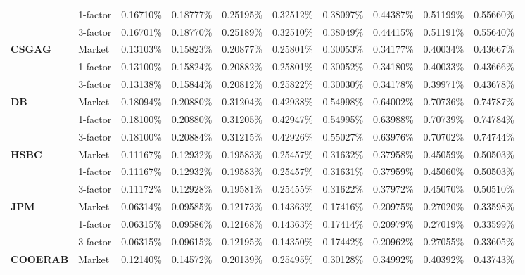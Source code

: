\documentclass[12pt,a4paper]{article}
\theoremstyle{plain}
\numberwithin{equation}{section}
\begin{document}
\begin{table}[t]
{\begin{tabular}{|rl|cccccccc|}
\cmidrule{3-10}          & 1-factor & 0.16710\% & 0.18777\% & 0.25195\% & 0.32512\% & 0.38097\% & 0.44387\% & 0.51199\% & 0.55660\% \\
          & 3-factor & 0.16701\% & 0.18770\% & 0.25189\% & 0.32510\% & 0.38049\% & 0.44415\% & 0.51191\% & 0.55640\% \\
    \midrule
    \midrule
    \multicolumn{1}{|l}{\textbf{CSGAG}} & Market & 0.13103\% & 0.15823\% & 0.20877\% & 0.25801\% & 0.30053\% & 0.34177\% & 0.40034\% & 0.43667\% \\
\cmidrule{3-10}          & 1-factor & 0.13100\% & 0.15824\% & 0.20882\% & 0.25801\% & 0.30052\% & 0.34180\% & 0.40033\% & 0.43666\% \\
          & 3-factor & 0.13138\% & 0.15844\% & 0.20812\% & 0.25822\% & 0.30030\% & 0.34178\% & 0.39971\% & 0.43678\% \\
    \midrule
    \midrule
    \multicolumn{1}{|l}{\textbf{DB}} & Market & 0.18094\% & 0.20880\% & 0.31204\% & 0.42938\% & 0.54998\% & 0.64002\% & 0.70736\% & 0.74787\% \\
\cmidrule{3-10}          & 1-factor & 0.18100\% & 0.20880\% & 0.31205\% & 0.42947\% & 0.54995\% & 0.63988\% & 0.70739\% & 0.74784\% \\
          & 3-factor & 0.18100\% & 0.20884\% & 0.31215\% & 0.42926\% & 0.55027\% & 0.63976\% & 0.70702\% & 0.74744\% \\
    \midrule
    \midrule
    \multicolumn{1}{|l}{\textbf{HSBC}} & Market & 0.11167\% & 0.12932\% & 0.19583\% & 0.25457\% & 0.31632\% & 0.37958\% & 0.45059\% & 0.50503\% \\
\cmidrule{3-10}          & 1-factor & 0.11167\% & 0.12932\% & 0.19583\% & 0.25457\% & 0.31631\% & 0.37959\% & 0.45060\% & 0.50503\% \\
          & 3-factor & 0.11172\% & 0.12928\% & 0.19581\% & 0.25455\% & 0.31622\% & 0.37972\% & 0.45070\% & 0.50510\% \\
    \midrule
    \midrule
    \multicolumn{1}{|l}{\textbf{JPM}} & Market & 0.06314\% & 0.09585\% & 0.12173\% & 0.14363\% & 0.17416\% & 0.20975\% & 0.27020\% & 0.33598\% \\
\cmidrule{3-10}          & 1-factor & 0.06315\% & 0.09586\% & 0.12168\% & 0.14363\% & 0.17414\% & 0.20979\% & 0.27019\% & 0.33599\% \\
          & 3-factor & 0.06315\% & 0.09615\% & 0.12195\% & 0.14350\% & 0.17442\% & 0.20962\% & 0.27055\% & 0.33605\% \\
    \midrule
    \multicolumn{1}{|l}{\textbf{COOERAB}} & Market & 0.12140\% & 0.14572\% & 0.20139\% & 0.25495\% & 0.30128\% & 0.34992\% & 0.40392\% & 0.43743\% \\

\end{tabular}}
\end{table}
\end{document}
